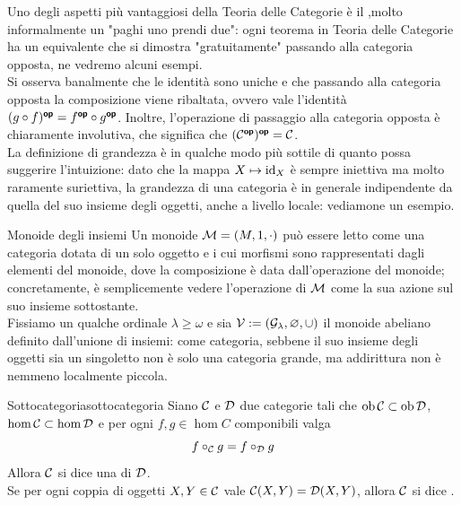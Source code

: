 \documentclass[openany]{book}
\renewcommand\C{\mc{C}}
\newcommand\D{\mc{D}}
\begin{document}
Uno degli aspetti più vantaggiosi della Teoria delle Categorie è il ,molto informalmente un "paghi uno prendi due": ogni teorema in Teoria delle Categorie ha un equivalente che si dimostra "gratuitamente" passando alla categoria opposta, ne vedremo alcuni esempi.\\
Si osserva banalmente che le identità sono uniche e che passando alla categoria opposta la composizione viene ribaltata, ovvero vale l'identità $(g\circ f)^{\text{\sffamily\textbf{op}}} = f^{\text{\sffamily\textbf{op}}}\circ g^{\text{\sffamily\textbf{op}}}$. Inoltre, l'operazione di passaggio alla categoria opposta è chiaramente involutiva, che significa che $(\C^\op)^\op = \C$.\\
La definizione di grandezza è in qualche modo più sottile di quanto possa suggerire l'intuizione: dato che la mappa $X\mapsto \operatorname{id}_X$ è sempre iniettiva ma molto raramente suriettiva, la grandezza di una categoria è in generale indipendente da quella del suo insieme degli oggetti, anche a livello locale: vediamone un esempio.

\begin{example}{Monoide degli insiemi}{}
    Un monoide $\mathcal{M} = (M,1,\cdot)$ può essere letto come una categoria dotata di un solo oggetto e i cui morfismi sono rappresentati dagli elementi del monoide, dove la composizione è data dall'operazione del monoide; concretamente, è semplicemente vedere l'operazione di $\mathcal{M}$ come la sua azione sul suo insieme sottostante.\\
    Fissiamo un qualche ordinale $\lambda\ge \omega$ e sia $\mathcal{V} := (\mathcal{G}_\lambda, \varnothing, \cup)$ il monoide abeliano definito dall'unione di insiemi: come categoria, sebbene il suo insieme degli oggetti sia un singoletto non è solo una categoria grande, ma addirittura non è nemmeno localmente piccola.
\end{example}


\begin{definition}{Sottocategoria}{sottocategoria}
    Siano $\C$ e $\D$ due categorie tali che $\ob\C \subset \ob\D$, $\hom\C \subset \hom\D$ e per ogni $f,g \in \hom C$ componibili valga 
    \[f\circ_\C g = f\circ_\D g\]
    Allora $\C$ si dice una  di $\D$.\\
    Se per ogni coppia di oggetti $X,Y \in \C$ vale $\C(X,Y)=\D(X,Y)$, allora $\C$ si dice .
\end{definition}
\end{document}
